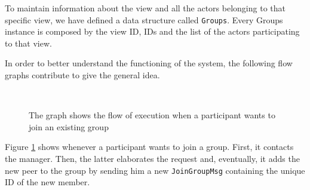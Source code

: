 \documentclass[conference]{IEEEtran}
\begin{document}
To maintain information about the view and all the actors belonging to that specific view, we have defined a data structure called \texttt{Groups}. 
Every Groups instance is composed by the view ID, IDs and the list of the actors participating to that view.

In order to better understand the functioning of the system, the following flow graphs contribute to give the general idea.
\begin{figure}[ht]%
	\centering
	\\%
	\caption{The graph shows the flow of execution when a participant
	wants to join an existing group}%
	\label{fig:join}%
\end{figure}
Figure \ref{fig:join} shows whenever a participant wants to join a group. First, it contacts the manager. 
Then, the latter elaborates the request and, eventually, it adds the new peer to the group by sending him a new \texttt{JoinGroupMsg} containing
the unique ID of the new member.
\end{document}
